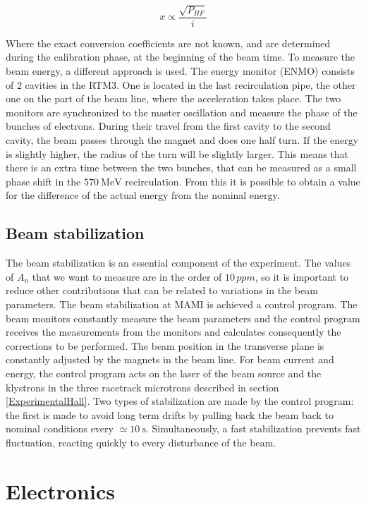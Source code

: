 \begin{equation} \label{eq:SignalToVfc}
x \propto \frac{\sqrt{P_{HF}}}{i}
\end{equation}

Where the exact conversion coefficients are not known, and are determined during the calibration phase, at the beginning of the beam time.
To measure the beam energy, a different approach is used. The energy monitor (ENMO) consists of 2 cavities in the RTM3. One is located in the last recirculation pipe, the other one on the part of the beam line, where the acceleration takes place. The two monitors are synchronized to the master oscillation and measure the phase of the bunches of electrons. During their travel from the first cavity to the second cavity, the beam passes through the magnet and does one half turn. If the energy is slightly higher, the radius of the turn will be slightly larger. This means that there is an extra time between the two bunches, that can be measured as a small phase shift in the $\SI{570}{\mega \electronvolt}$ recirculation. From this it is possible to obtain a value for the difference of the actual energy from the nominal energy.

\subsection{Beam stabilization}

The beam stabilization is an essential component of the experiment. The values of $A_{n}$ that we want to measure are in the order of  $10 \, ppm$, so it is important to reduce other contributions that can be related to variations in the beam parameters. The beam stabilization at MAMI is achieved a control program. The beam monitors constantly measure the beam parameters and the control program receives the measurements from the monitors and calculates consequently the corrections to be performed. 
The beam position in the transverse plane is constantly adjusted by the magnets in the beam line. For beam current and energy, the control program acts on the laser of the beam source and the klystrons in the three racetrack microtrons described in section \ref{ExperimentalHall}. Two types of stabilization are made by the control program: the first is made to avoid long term drifts by pulling back the beam back to nominal conditions every $\simeq \SI{10}{\second}$. Simultaneously, a fast stabilization prevents fast fluctuation, reacting quickly to every disturbance of the beam. 

\section{Electronics}
